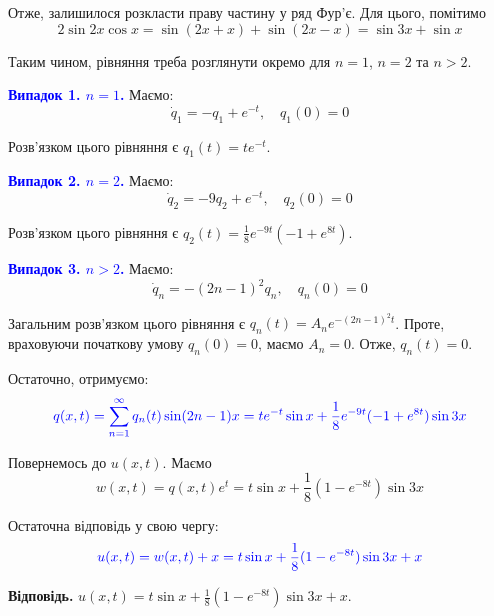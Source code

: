 \documentclass{hw_template}
\begin{document}
Отже, залишилося розкласти праву частину у ряд Фур'є. Для цього, помітимо 
\begin{equation*}
    2 \sin 2x \cos x = \sin(2x+x) + \sin(2x-x) = \sin 3x + \sin x
\end{equation*}

Таким чином, рівняння треба розглянути окремо для $n=1$, $n=2$ та $n>2$.

\textcolor{blue}{\textbf{Випадок 1. $n=1$.}} Маємо:
\begin{equation*}
    \dot{q}_1 = -q_1 + e^{-t}, \quad q_1(0) = 0
\end{equation*}

Розв'язком цього рівняння є $q_1(t) = te^{-t}$.

\textcolor{blue}{\textbf{Випадок 2. $n=2$.}} Маємо:
\begin{equation*}
    \dot{q}_2 = -9q_2 + e^{-t}, \quad q_2(0) = 0
\end{equation*}

Розв'язком цього рівняння є $q_2(t) = \frac{1}{8}e^{-9t}(-1+e^{8t})$.

\textcolor{blue}{\textbf{Випадок 3. $n>2$.}} Маємо:
\begin{equation*}
    \dot{q}_n = -(2n-1)^2q_n, \quad q_n(0) = 0
\end{equation*}

Загальним розв'язком цього рівняння є $q_n(t) = A_n e^{-(2n-1)^2t}$.
Проте, враховуючи початкову умову $q_n(0)=0$, маємо $A_n=0$.
Отже, $q_n(t) = 0$.

Остаточно, отримуємо:
\begin{equation*}
    \textcolor{blue}{q(x,t) = \sum_{n=1}^{\infty}q_n(t)\sin(2n-1)x = te^{-t}\sin x + \frac{1}{8}e^{-9t}(-1+e^{8t})\sin 3x}
\end{equation*}

Повернемось до $u(x,t)$. Маємо
\begin{equation*}
    w(x,t) = q(x,t)e^t = t\sin x + \frac{1}{8}(1-e^{-8t})\sin 3x
\end{equation*}

Остаточна відповідь у свою чергу:
\begin{equation*}
    \textcolor{blue}{u(x,t) = w(x,t) + x = t\sin x + \frac{1}{8}(1-e^{-8t})\sin 3x + x}
\end{equation*}

\textbf{Відповідь.} $u(x,t) = t\sin x + \frac{1}{8}(1-e^{-8t})\sin 3x + x$.
\end{document}
